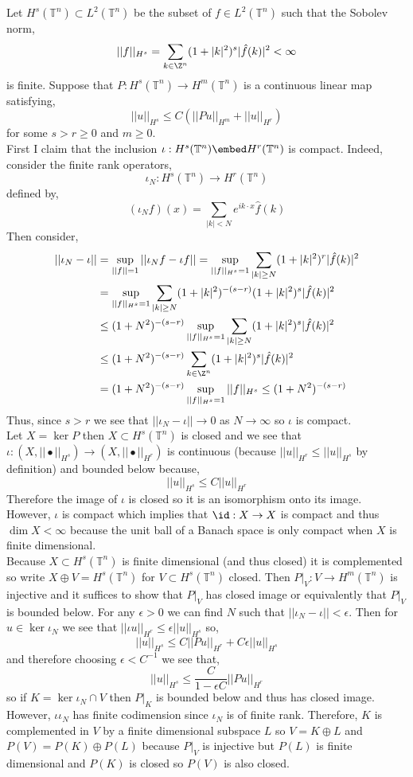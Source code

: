 \documentclass[12pt]{article}
\renewcommand{\T}{\mathbb{T}}
\begin{document}
Let $H^s(\T^n) \subset L^2(\T^n)$ be the subset of $f \in L^2(\T^n)$ such that the Sobolev norm,
\[ || f ||_{H^s} = \sum_{k \in \Z^n} (1 + |k|^2)^s |\hat{f}(k)|^2 < \infty \]
is finite. Suppose that $P : H^s(\T^n) \to H^m(\T^n)$ is a continuous linear map satisfying,
\[ || u ||_{H^s} \le C \left( || P u ||_{H^m} + || u ||_{H^r} \right) \]
for some $s > r \ge 0$ and $m \ge 0$.
\bigskip\\
First I claim that the inclusion $\iota : H^s(\T^n) \embed H^r(\T^n)$ is compact. Indeed, consider the finite rank operators,
\[ \iota_N : H^s(\T^n) \to H^r(\T^n) \]
defined by,
\[ (\iota_N f)(x) = \sum_{|k| < N} e^{i k \cdot x} \hat{f}(k) \]
Then consider,
\begin{align*}
|| \iota_N - \iota || & = \sup_{|| f || = 1} || \iota_N f - \iota f || = \sup_{|| f ||_{H^s} = 1} \sum_{|k| \ge N} (1 + |k|^2)^r |\hat{f}(k)|^2 
\\
& = \sup_{|| f ||_{H^s} = 1} \sum_{|k| \ge N} (1 + |k|^2)^{-(s - r)} (1 + |k|^2)^{s} |\hat{f}(k)|^2 
\\
& \le (1 + N^2)^{-(s - r)} \sup_{|| f ||_{H^s} = 1}  \sum_{|k| \ge N} (1 + |k|^2)^s |\hat{f}(k)|^2 
\\
& \le (1 + N^2)^{-(s - r)} \sum_{k \in \Z^n} (1 + |k|^2)^s |\hat{f}(k)|^2 
\\
& = (1 + N^2)^{-(s - r)} \sup_{|| f ||_{H^s} = 1} || f ||_{H^s} \le (1 + N^2)^{-(s - r)}
\end{align*}
Thus, since $s > r$ we see that $|| \iota_N - \iota || \to 0$ as $N \to \infty$ so $\iota$ is compact.
\bigskip\\
Let $X = \ker{P}$ then $X \subset H^s(\T^n)$ is closed and we see that $\iota : (X, || \bullet||_{H^s}) \to (X, || \bullet ||_{H^r})$ is continuous (because $|| u ||_{H^r} \le || u ||_{H^s}$ by definition) and bounded below because,
\[ || u ||_{H^s} \le C || u ||_{H^r} \]
Therefore the image of $\iota$ is closed so it is an isomorphism onto its image. However, $\iota$ is compact which implies that $\id : X \to X$ is compact and thus $\dim{X} < \infty$ because the unit ball of a Banach space is only compact when $X$ is finite dimensional.
\bigskip\\
Because $X \subset H^s(\T^n)$ is finite dimensional (and thus closed) it is complemented so write $X \oplus V = H^s(\T^n)$ for $V \subset H^s(\T^n)$ closed. Then $P|_V : V \to H^m(\T^n)$ is injective and it suffices to show that $P|_V$ has closed image or equivalently that $P|_V$ is bounded below. For any $\epsilon > 0$ we can find $N$ such that $|| \iota_N - \iota || < \epsilon$. Then for $u \in \ker{\iota_N}$ we see that $|| \iota u ||_{H^r} \le \epsilon || u ||_{H^s}$ so,
\[ || u ||_{H^s} \le C || P u ||_{H^r} + C \epsilon || u ||_{H^s} \]
and therefore choosing $\epsilon < C^{-1}$ we see that,
\[ || u ||_{H^s} \le \frac{C}{1 - \epsilon C} || P u ||_{H^r} \]
so if $K = \ker{\iota_N} \cap V$ then $P|_K$ is bounded below and thus has closed image. However, $\iota{\iota_N}$ has finite codimension since $\iota_N$ is of finite rank. Therefore, $K$ is complemented in $V$ by a finite dimensional subspace $L$ so $V = K \oplus L$ and $P(V) = P(K) \oplus P(L)$ because $P|_V$ is injective but $P(L)$ is finite dimensional and $P(K)$ is closed so $P(V)$ is also closed.
\end{document}
